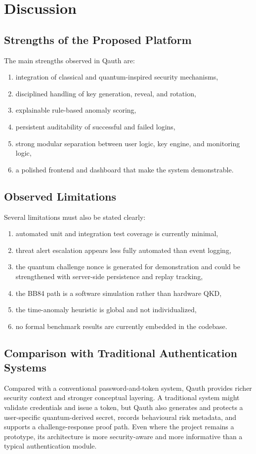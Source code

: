 \section{Discussion}

\subsection{Strengths of the Proposed Platform}
The main strengths observed in Qauth are:

\begin{enumerate}
    \item integration of classical and quantum-inspired security mechanisms,
    \item disciplined handling of key generation, reveal, and rotation,
    \item explainable rule-based anomaly scoring,
    \item persistent auditability of successful and failed logins,
    \item strong modular separation between user logic, key engine, and monitoring logic,
    \item a polished frontend and dashboard that make the system demonstrable.
\end{enumerate}

\subsection{Observed Limitations}
Several limitations must also be stated clearly:

\begin{enumerate}
    \item automated unit and integration test coverage is currently minimal,
    \item threat alert escalation appears less fully automated than event logging,
    \item the quantum challenge nonce is generated for demonstration and could be strengthened with server-side persistence and replay tracking,
    \item the BB84 path is a software simulation rather than hardware QKD,
    \item the time-anomaly heuristic is global and not individualized,
    \item no formal benchmark results are currently embedded in the codebase.
\end{enumerate}

\subsection{Comparison with Traditional Authentication Systems}
Compared with a conventional password-and-token system, Qauth provides richer security context and stronger conceptual layering. A traditional system might validate credentials and issue a token, but Qauth also generates and protects a user-specific quantum-derived secret, records behavioural risk metadata, and supports a challenge-response proof path. Even where the project remains a prototype, its architecture is more security-aware and more informative than a typical authentication module.

